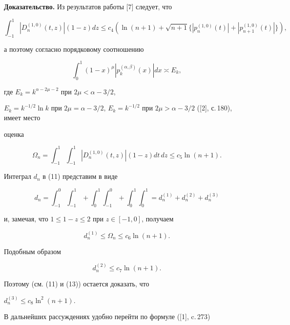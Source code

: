 {\bf Доказательство.} Из результатов работы [7] следует, что


$$


\int_{-1}^1|


D_n^{(1,0)}(t,z)|(1-z)dz \le c_4 (\ln (n+1)+\sqrt{n+1}\{|


p_n^{(1,0)}(t)|+|p_{n+1}^{(1,0)}(t)|\}),


$$


а поэтому согласно порядковому соотношению


\begin{equation}


\int_0^1(1-x)^{\mu}|p_k^{(\alpha,\beta)} (x)|dx \asymp E_k,


\end{equation}


где $E_k =k^{\alpha -2\mu -2} $ при $2\mu <\alpha -3/2$,


$E_k =k^{-1/2}\ln k$ при $ 2\mu = \alpha - 3/2$, $E_k =


k^{-1/2}$ при $2\mu > \alpha -3/2$ ([2], с.\,180), имеет место


оценка


$$


\Omega_n =\int_{-1}^1\int_{-1}^1|


D_n^{(1,0)}(t,z)|(1-z) dt\,dz \le c_5 \ln(n+1).


$$


Интеграл $d_n$ в (11) представим в виде


\begin{equation}


d_n = \int_{-1}^0\int_{-1}^1 +\int_{0}^1\int_{-1}^0+\int_{0}^1\int_{0


}^1 = d_n^{(1)}+d_n^{(2)}+d_n^{(3)}


\end{equation}


и, замечая, что $1\le 1-z \le2$ при $z\in [-1,0]$, получаем


$$


d_n^{(1)}\le \Omega_n\le c_6 \ln (n+1).


$$


Подобным образом


$$


d_n^{(2)}\le c_7 \ln (n+1).


$$


Поэтому (см. (11) и (13)) остается доказать, что


$d_n^{(3)}\le c_8 \ln^2 (n+1)$.


В дальнейших рассуждениях удобно перейти по формуле ([1], c.\,273)


